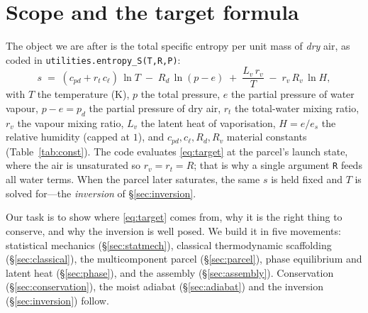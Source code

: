 \documentclass[11pt,a4paper]{article}
\theoremstyle{definition}
\newcommand{\Rd}{R_d}
\newcommand{\Rv}{R_v}
\newcommand{\cpd}{c_{pd}}
\newcommand{\cl}{c_\ell}
\newcommand{\Lv}{L_v}
\newcommand{\rt}{r_t}
\newcommand{\rvv}{r_v}
\newcommand{\es}{e_s}
\newcommand{\pd}{p_d}
\begin{document}
\tableofcontents

\section{Scope and the target formula}\label{sec:scope}

The object we are after is the total specific entropy per unit mass of
\emph{dry} air, as coded in \texttt{utilities.entropy\_S(T,R,P)}:
\begin{equation}\label{eq:target}
s \;=\; (\cpd+\rt\,\cl)\,\ln T \;-\; \Rd\,\ln(p-e) \;+\; \frac{\Lv\,\rvv}{T}
     \;-\; \rvv\,\Rv\,\ln H,
\end{equation}
with $T$ the temperature (K), $p$ the total pressure, $e$ the partial
pressure of water vapour, $p-e=\pd$ the partial pressure of dry air,
$\rt$ the total-water mixing ratio, $\rvv$ the vapour mixing ratio, $\Lv$ the
latent heat of vaporisation, $H=e/\es$ the relative humidity (capped at $1$),
and $\cpd,\cl,\Rd,\Rv$ material constants (Table~\ref{tab:const}). The code
evaluates \eqref{eq:target} at the parcel's launch state, where the air is
unsaturated so $\rvv=\rt=R$; that is why a single argument \texttt{R} feeds all
water terms. When the parcel later saturates, the same $s$ is held fixed and
$T$ is solved for---the \emph{inversion} of \S\ref{sec:inversion}.

Our task is to show where \eqref{eq:target} comes from, why it is the right
thing to conserve, and why the inversion is well posed. We build it in five
movements: statistical mechanics (\S\ref{sec:statmech}), classical
thermodynamic scaffolding (\S\ref{sec:classical}), the multicomponent parcel
(\S\ref{sec:parcel}), phase equilibrium and latent heat (\S\ref{sec:phase}),
and the assembly (\S\ref{sec:assembly}). Conservation
(\S\ref{sec:conservation}), the moist adiabat (\S\ref{sec:adiabat}) and the
inversion (\S\ref{sec:inversion}) follow.
\end{document}
